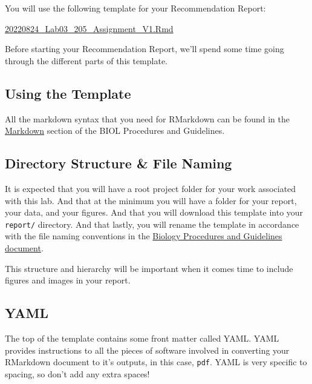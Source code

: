 \documentclass[
]{book}
\begin{document}
You will use the following template for your Recommendation Report:

\href{https://osf.io/download/g5zxk}{20220824\_Lab03\_205\_Assignment\_V1.Rmd}

Before starting your Recommendation Report, we'll spend some time going through the different parts of this template.

\hypertarget{using-the-template}{%
\subsection*{Using the Template}\label{using-the-template}}

All the markdown syntax that you need for RMarkdown can be found in the \href{https://ubco-biology.github.io/Procedures-and-Guidelines/markdown-1.html}{Markdown} section of the BIOL Procedures and Guidelines.

\hypertarget{directory-structure-file-naming}{%
\subsection*{Directory Structure \& File Naming}\label{directory-structure-file-naming}}

It is expected that you will have a root project folder for your work associated with this lab. And that at the minimum you will have a folder for your report, your data, and your figures. And that you will download this template into your \texttt{report/} directory. And that lastly, you will rename the template in accordance with the file naming conventions in the \href{https://ubco-biology.github.io/Procedures-and-Guidelines/file-naming.html}{Biology Procedures and Guidelines document}.

This structure and hierarchy will be important when it comes time to include figures and images in your report.

\hypertarget{yaml}{%
\subsection*{YAML}\label{yaml}}

The top of the template contains some front matter called YAML. YAML provides instructions to all the pieces of software involved in converting your RMarkdown document to it's outputs, in this case, \texttt{pdf}. YAML is very specific to spacing, so don't add any extra spaces!
\end{document}
